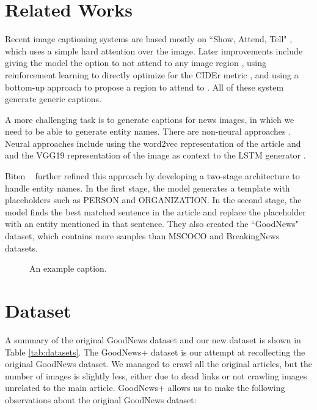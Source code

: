 \documentclass[10pt,twocolumn,letterpaper]{article}
\begin{document}
\section{Related Works}

Recent image captioning systems are based mostly on ``Show, Attend, Tell"
\cite{Xu2015ShowAA}, which uses a simple hard attention over the image. Later
improvements include giving the model the option to not attend to any image
region \cite{Lu2016KnowingWT}, using reinforcement learning to directly
optimize for the CIDEr metric \cite{Rennie2016SelfCriticalST}, and using a
bottom-up approach to propose a region to attend to
\cite{Anderson2017BottomUpAT}. All of these system generate generic captions.

A more challenging task is to generate captions for news images, in which we
need to be able to generate entity names. There are non-neural approaches
\cite{Feng2013AutomaticCG,Tariq2017ACE}. Neural approaches include using the
word2vec representation of the article and and the VGG19 representation of the
image as context to the LSTM generator \cite{Ramisa2016BreakingNewsAA}.

Biten \etal~\cite{Biten2019GoodNews} further refined this approach by
developing a two-stage architecture to handle entity names. In the first stage,
the model generates a template with placeholders such as PERSON and
ORGANIZATION. In the second stage, the model finds the best matched sentence in
the article and replace the placeholder with an entity mentioned in that
sentence. They also created the ``GoodNews" dataset, which contains more
samples than MSCOCO \cite{Lin2014MicrosoftCC} and BreakingNews
\cite{Ramisa2016BreakingNewsAA} datasets.

\begin{figure}[t]
   \begin{center}
   \fbox{\rule{0pt}{2in} \rule{0.9\linewidth}{0pt}}
   \end{center}
      \caption{An example caption.}
   \label{fig:long}
   \label{fig:onecol}
   \end{figure}

\section{Dataset}

A summary of the original GoodNews dataset and our new dataset is shown in
Table \ref{tab:datasets}. The GoodNews+ dataset is our attempt at recollecting
the original GoodNews dataset. We managed to crawl all the original articles,
but the number of images is slightly less, either due to dead links or
not crawling images unrelated to the main article. GoodNews+ allows us to make the
following observations about the original GoodNews dataset:
\end{document}
